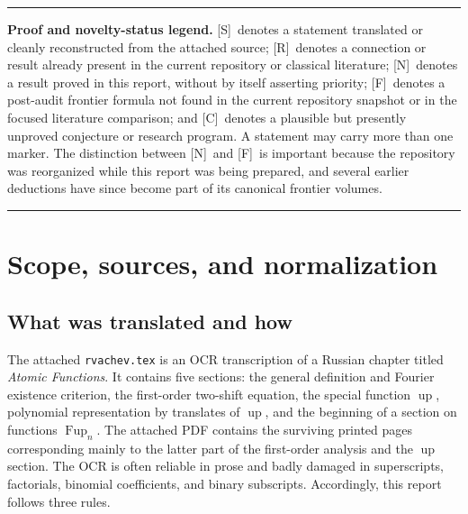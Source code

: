 \documentclass[11pt,oneside]{article}
\theoremstyle{definition}
\theoremstyle{remark}
\newcommand{\Up}{\operatorname{up}}
\newcommand{\ii}{\mathrm i}
\newcommand{\Smark}{\textcolor{sourceblue}{\textsf{[S]}}}
\newcommand{\Rmark}{\textcolor{sourceblue}{\textsf{[R]}}}
\newcommand{\Nmark}{\textcolor{newgreen}{\textsf{[N]}}}
\newcommand{\Cmark}{\textcolor{conjecturered}{\textsf{[C]}}}
\newcommand{\Fmark}{\textcolor{frontierpurple}{\textsf{[F]}}}
\newenvironment{boxedremark}{%
  \par\smallskip\noindent\begin{center}\begin{minipage}{0.94\textwidth}%
  \color{black}\hrule\vspace{0.6em}\small
}{%
  \vspace{0.6em}\hrule\end{minipage}\end{center}\smallskip
}
\begin{document}
\begin{abstract}
A further layer gives Bernoulli-number cumulants and Bell-polynomial moments for every $a>1$, Gaussian and uniform parameter limits, and an exact general-base negative-Laplace decomposition.  Its one-periodic correction has nonzero Fourier coefficients
\[
 -\frac{\Gamma(-\chi_k)\zeta(1-\chi_k)}{\log a},\qquad
 \chi_k=\frac{2\pi\ii k}{\log a}.
\]
A lower-$W_{-1}$ saddle coordinate, explicit conjectures, and reproducible numerical experiments complete the report.
\end{abstract}

\begin{boxedremark}
\textbf{Proof and novelty-status legend.}
\Smark\ denotes a statement translated or cleanly reconstructed from the attached source;
\Rmark\ denotes a connection or result already present in the current repository or classical literature;
\Nmark\ denotes a result proved in this report, without by itself asserting priority;
\Fmark\ denotes a post-audit frontier formula not found in the current repository snapshot or in the focused literature comparison; and
\Cmark\ denotes a plausible but presently unproved conjecture or research program.  A statement may carry more than one marker.  The distinction between \Nmark\ and \Fmark\ is important because the repository was reorganized while this report was being prepared, and several earlier deductions have since become part of its canonical frontier volumes.
\end{boxedremark}

\tableofcontents
\newpage

\section{Scope, sources, and normalization}
\label{sec:scope}

\subsection{What was translated and how}

The attached \texttt{rvachev.tex} is an OCR transcription of a Russian chapter titled
\emph{Atomic Functions}.  It contains five sections: the general definition and Fourier
existence criterion, the first-order two-shift equation, the special function $\Up$, polynomial
representation by translates of $\Up$, and the beginning of a section on functions
$\operatorname{Fup}_n$.  The attached PDF contains the surviving printed pages corresponding
mainly to the latter part of the first-order analysis and the $\Up$ section.  The OCR is often
reliable in prose and badly damaged in superscripts, factorials, binomial coefficients, and
binary subscripts.  Accordingly, this report follows three rules.
\end{document}
